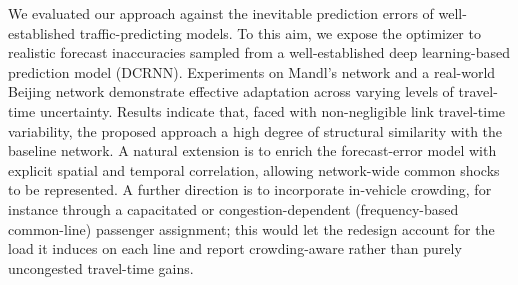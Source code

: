 \documentclass[a4paper,fleqn]{cas-sc}
\begin{document}
We evaluated our approach against the inevitable prediction errors of well-established traffic-predicting models. To this aim, we expose the optimizer to realistic forecast inaccuracies sampled from a well-established deep learning-based prediction model (DCRNN).
Experiments on Mandl's network and a real-world Beijing network demonstrate effective adaptation across varying levels of travel-time uncertainty. 
%
Results indicate that, faced with non-negligible link travel-time variability, the proposed approach  a high degree of structural similarity with the baseline network.
%
%
A natural extension is to enrich the forecast-error model with explicit spatial and temporal correlation, allowing network-wide common shocks to be represented.
A further direction is to
incorporate in-vehicle crowding, for instance through a capacitated or congestion-dependent (frequency-based common-line) passenger assignment; this would let the redesign account for the load it induces on each line and report crowding-aware rather than purely uncongested travel-time gains.



\end{document}
